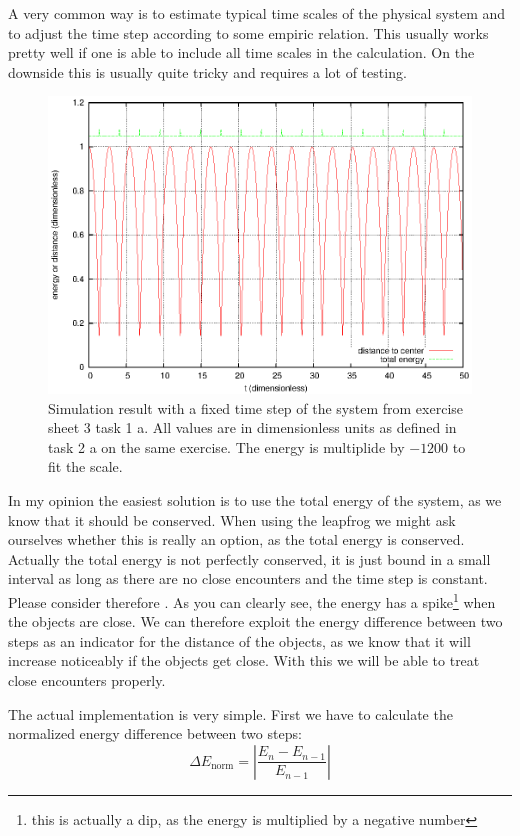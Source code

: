 \documentclass[a4paper,10pt,openany]{article}
\begin{document}
A very common way is to estimate typical time scales of the physical system and to adjust the time step according to some empiric relation. This usually works pretty well if one is able to include all time scales in the calculation. On the downside this is usually quite tricky and requires a lot of testing.

\begin{figure}[h]
\begin{center}
\includegraphics[width=.8\textwidth]{energy_distance.eps}
\end{center}
\caption{Simulation result with a fixed time step of the system from exercise sheet 3 task 1 a. All values are in dimensionless units as defined in task 2 a on the same exercise. The energy is multiplide by $-1200$ to fit the scale.}\label{fig:energy distance}
\end{figure}

In my opinion the easiest solution is to use the total energy of the system, as we know that it should be conserved. When using the leapfrog we might ask ourselves whether this is really an option, as the total energy is conserved. Actually the total energy is not perfectly conserved, it is just bound in a small interval as long as there are no close encounters and the time step is constant. Please consider therefore . As you can clearly see, the energy has a spike\footnote{this is actually a dip, as the energy is multiplied by a negative number} when the objects are close. We can therefore exploit the energy difference between two steps as an indicator for the distance of the objects, as we know that it will increase noticeably if the objects get close. With this we will be able to treat close encounters properly.

The actual implementation is very simple. First we have to calculate the normalized energy difference between two steps:
\begin{equation}\label{eq:energy error}
\Delta E_\mathrm{norm} = \left| \frac{E_n - E_{n-1}}{E_{n-1}} \right|
\end{equation}
\end{document}
